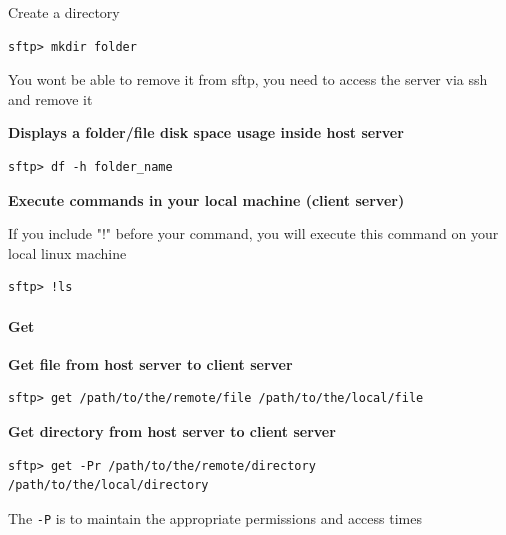 \documentclass{article}
\newenvironment{blocktemplateI}[1]{%
    \tcolorbox[beamer,%
    noparskip,breakable,
    colframe=Violet,%
    colbacklower=Black,%
    title=#1]}%
    {\endtcolorbox}
\newenvironment{codetemplate}[1][]{%
  \mybasecolorbox[#1]
  \itshape
}{%
  \endmybasecolorbox
}
\begin{document}
Create a directory
\begin{codetemplate}{}
\begin{verbatim}
sftp> mkdir folder
\end{verbatim}
\end{codetemplate}

\begin{blocktemplateI}{NOTE}
You wont be able to remove it from sftp, you need to access the server via ssh and remove it
\end{blocktemplateI}

\textbf{Displays a folder/file disk space usage inside host server}
\begin{codetemplate}{}
\begin{verbatim}
sftp> df -h folder_name
\end{verbatim}
\end{codetemplate}

\textbf{Execute commands in your local machine (client server)}

If you include "!" before your command, you will execute this command on your local linux machine
\begin{codetemplate}{}
\begin{verbatim}
sftp> !ls
\end{verbatim}
\end{codetemplate}

\paragraph{Get}

\textbf{Get file from host server to client server}
\begin{codetemplate}{}
\begin{verbatim}
sftp> get /path/to/the/remote/file /path/to/the/local/file
\end{verbatim}
\end{codetemplate}

\textbf{Get directory from host server to client server}
\begin{codetemplate}{}
\begin{verbatim}
sftp> get -Pr /path/to/the/remote/directory /path/to/the/local/directory
\end{verbatim}
\end{codetemplate}

\begin{blocktemplateI}{NOTE}
The \verb|-P| is to maintain the appropriate permissions and access times
\end{blocktemplateI}
\end{document}
